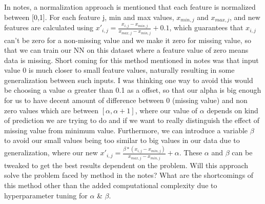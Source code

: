 \documentclass{article}
\begin{document}
In notes, a normalization approach is mentioned that each feature is normalized between [0,1]. For each feature j, min and max values, $x_{min, j}$ and $x_{max,j}$, and new features are calculated using $x'_{i,j} = \frac{x_{i,j} - x_{min,j}}{x_{max,j} - x_{min,j}} + 0.1$, which guarantees that $x_{i,j}$ can't be zero for a non-missing value and we make it zero for missing value, so that we can train our NN on this dataset where a feature value of zero means data is missing. Short coming for this method mentioned in notes was that input value 0 is much closer to small feature values, naturally resulting in some generalization between such inputs. I was thinking one way to avoid this would be choosing a value $\alpha$ greater than 0.1 as a offset, so that our alpha is big enough for us to have decent amount of difference between 0 (missing value) and non zero values which are between $[\alpha, \alpha+1]$, where our value of $\alpha$ depends on kind of prediction we are trying to do and if we want to really distinguish the effect of missing value from minimum value. Furthermore, we can introduce a variable $\beta$ to avoid our small values being too similar to big values in our data due to generalization, where our new  $x'_{i,j} = \frac{\beta*(x_{i,j} - x_{min,j})}{x_{max,j} - x_{min,j}} + \alpha$. These $\alpha$ and $\beta$ can be tweaked to get the best results dependent on the problem. Will this approach solve the problem faced by method in the notes? What are the shortcomings of this method other than the added computational complexity due to hyperparameter tuning for $\alpha$ \& $\beta$.
\end{document}
